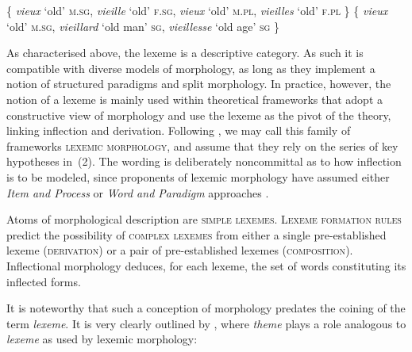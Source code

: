 \documentclass[output=paper]{langsci/langscibook}
\begin{document}
\begin{exe}
\ex\begin{xlist}
\ex  \{ \emph{vieux} `old' \textsc{m.sg}, \emph{vieille} `old' \textsc{f.sg},
\emph{vieux} `old' \textsc{m.pl}, \emph{vieilles} `old' \textsc{f.pl} \}
\ex 
\{ \emph{vieux} `old' \textsc{m.sg}, \emph{vieillard} `old man' \textsc{sg},
\emph{vieillesse} `old age' \textsc{sg} \}
\end{xlist}
\end{exe}

As characterised above, the lexeme is a descriptive category. As such it
is compatible with diverse models of morphology, as long as they
implement a notion of structured paradigms and split morphology. In
practice, however, the notion of a lexeme is mainly used within
theoretical frameworks that adopt a constructive view of morphology
\citep{Blevins06} and use the lexeme as the pivot of the theory, linking
inflection and derivation. Following \citet{Fradin03}, we may call this
family of frameworks \textsc{lexemic morphology}, and assume that they
rely on the series of key hypotheses in~(2). The wording is deliberately
noncommittal as to how inflection is to be modeled, since proponents of
lexemic morphology have assumed either \emph{Item and Process} or
\emph{Word and Paradigm} approaches \citep{Hockett54}.

\begin{exe}
\ex\begin{xlist}
\ex  Atoms of morphological description are \textsc{simple lexemes}.
\ex
\textsc{Lexeme formation rules} predict the possibility of
\textsc{complex lexemes}  from either a single pre-established
lexeme (\textsc{derivation}) or a pair of pre-established lexemes
(\textsc{composition}).
\ex Inflectional morphology deduces, for each lexeme, the set of words
constituting its inflected forms.
\end{xlist}
\end{exe}

It is noteworthy that such a conception of morphology predates the
coining of the term \emph{lexeme}. It is very clearly outlined by
\citet{Kurylowicz}, where \emph{theme} plays a role analogous to
\emph{lexeme} as used by lexemic morphology:
\end{document}
